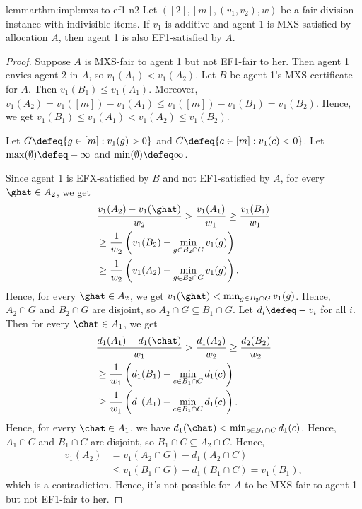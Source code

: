 \begin{restatable}[MXS $\fimplies$ EF1 for $n=2$]{lemma}{rthm:impl:mxs-to-ef1-n2}
\label{thm:impl:mxs-to-ef1-n2}
Let $([2], [m], (v_1, v_2), w)$ be a fair division instance with indivisible items.
If $v_1$ is additive and agent 1 is MXS-satisfied by allocation $A$,
then agent 1 is also EF1-satisfied by $A$.
\end{restatable}
\begin{proof}
Suppose $A$ is MXS-fair to agent 1 but not EF1-fair to her.
Then agent 1 envies agent 2 in $A$, so $v_1(A_1) < v_1(A_2)$.
Let $B$ be agent 1's MXS-certificate for $A$. Then $v_1(B_1) \le v_1(A_1)$.
Moreover, $v_1(A_2) = v_1([m]) - v_1(A_1) \le v_1([m]) - v_1(B_1) = v_1(B_2)$.
Hence, we get $v_1(B_1) \le v_1(A_1) < v_1(A_2) \le v_1(B_2)$.

Let $G \defeq \{g \in [m]: v_1(g) > 0\}$ and $C \defeq \{c \in [m]: v_1(c) < 0\}$.
Let $\max(\emptyset) \defeq -\infty$ and $\min(\emptyset) \defeq \infty$.

Since agent 1 is EFX-satisfied by $B$ and not EF1-satisfied by $A$,
for every $\ghat \in A_2$, we get
\begin{align*}
& \frac{v_1(A_2) - v_1(\ghat)}{w_2} > \frac{v_1(A_1)}{w_1}
\ge \frac{v_1(B_1)}{w_1}
\\ &\ge \frac{1}{w_2}\left(v_1(B_2) - \min_{g \in B_2 \cap G} v_1(g)\right)
\\ &\ge \frac{1}{w_2}\left(v_1(A_2) - \min_{g \in B_2 \cap G} v_1(g)\right).
\end{align*}
Hence, for every $\ghat \in A_2$, we get $v_1(\ghat) < \min_{g \in B_2 \cap G} v_1(g)$.
Hence, $A_2 \cap G$ and $B_2 \cap G$ are disjoint, so $A_2 \cap G \subseteq B_1 \cap G$.
Let $d_i \defeq -v_i$ for all $i$. Then for every $\chat \in A_1$, we get
\begin{align*}
& \frac{d_1(A_1) - d_1(\chat)}{w_1} > \frac{d_1(A_2)}{w_2}
\ge \frac{d_2(B_2)}{w_2}
\\ &\ge \frac{1}{w_1}\left(d_1(B_1) - \min_{c \in B_1 \cap C} d_1(c)\right)
\\ &\ge \frac{1}{w_1}\left(d_1(A_1) - \min_{c \in B_1 \cap C} d_1(c)\right).
\end{align*}
Hence, for every $\chat \in A_1$, we have $d_1(\chat) < \min_{c \in B_1 \cap C} d_1(c)$.
Hence, $A_1 \cap C$ and $B_1 \cap C$ are disjoint, so $B_1 \cap C \subseteq A_2 \cap C$.
Hence,
\begin{align*}
v_1(A_2) &= v_1(A_2 \cap G) - d_1(A_2 \cap C)
\\ &\le v_1(B_1 \cap G) - d_1(B_1 \cap C) = v_1(B_1),
\end{align*}
which is a contradiction.
Hence, it's not possible for $A$ to be MXS-fair to agent 1 but not EF1-fair to her.
\end{proof}

